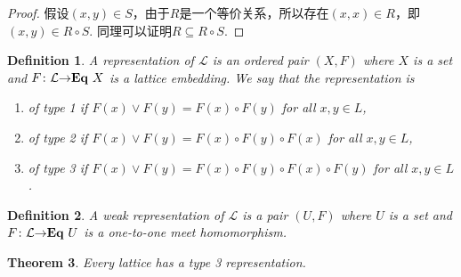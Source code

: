 \documentclass{article}
\newtheorem{theorem}{Theorem}[section]
\newtheorem{definition}[theorem]{Definition}
\newcommand*{\xfunc}[4]{{#2}\colon{#3}{#1}{#4}}
\newcommand*{\func}[3]{\xfunc{\to}{#1}{#2}{#3}}
\newcommand\lattice{\mathcal{L}}
\newcommand\eql[1]{\ensuremath\mathbf{Eq}~{#1}}
\begin{document}
\begin{proof}
假设$(x, y) \in S$，由于$R$是一个等价关系，所以存在$(x,x) \in R$，即$(x, y) \in R \circ S$. 同理可以证明$R \subseteq R \circ S$. 
\end{proof}

\begin{definition}
\rm A representation of $\lattice$ is an ordered pair $(X,F)$ where $X$ is a set and $\func{F}{\lattice}{\eql{X}}$ is a lattice embedding. We say that the representation is 
\begin{enumerate}
	\item of {\color{red} type 1} if $F(x) \vee F(y) = F(x) \circ F(y)$ for all $x,y \in L$,
	\item of {\color{red} type 2} if $F(x) \vee F(y) = F(x) \circ F(y) \circ F(x)$ for all $x,y \in L$,
	\item of {\color{red} type 3} if $F(x) \vee F(y) = F(x) \circ F(y) \circ F(x) \circ F(y)$ for all $x,y \in L$.
\end{enumerate}
\end{definition}

\begin{definition}
\rm A weak representation of $\lattice$ is a pair $(U,F)$ where $U$ is a set and $\func{F}{\lattice}{\eql{U}}$ is a one-to-one meet homomorphism.
\end{definition}

\begin{theorem}
\rm Every lattice has a type 3 representation.
\end{theorem}
\end{document}
